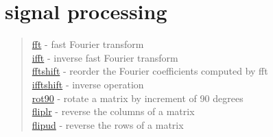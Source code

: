 \chapter*{signal processing}

\begin{quote}
\noindent
\hyperlink{fft}{fft} - {fast Fourier transform} \\
\hyperlink{ifft}{ifft} - {inverse fast Fourier transform} \\
\hyperlink{fftshift}{fftshift} - {reorder the Fourier coefficients computed by fft} \\
\hyperlink{ifftshift}{ifftshift} - {inverse operation} \\
\hyperlink{rot90}{rot90} - {rotate a matrix by increment of 90 degrees} \\
\hyperlink{fliplr}{fliplr} - {reverse the columns of a matrix} \\
\hyperlink{flipud}{flipud} - {reverse the rows of a matrix} \\
\end{quote}

 
 
 

